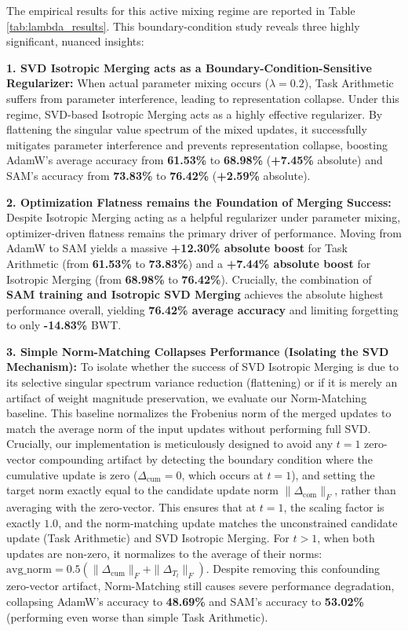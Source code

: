 The empirical results for this active mixing regime are reported in Table \ref{tab:lambda_results}. This boundary-condition study reveals three highly significant, nuanced insights:

\textbf{1. SVD Isotropic Merging acts as a Boundary-Condition-Sensitive Regularizer:} When actual parameter mixing occurs ($\lambda = 0.2$), Task Arithmetic suffers from parameter interference, leading to representation collapse. Under this regime, SVD-based Isotropic Merging acts as a highly effective regularizer. By flattening the singular value spectrum of the mixed updates, it successfully mitigates parameter interference and prevents representation collapse, boosting AdamW's average accuracy from \textbf{61.53\%} to \textbf{68.98\%} (\textbf{+7.45\%} absolute) and SAM's accuracy from \textbf{73.83\%} to \textbf{76.42\%} (\textbf{+2.59\%} absolute).

\textbf{2. Optimization Flatness remains the Foundation of Merging Success:} Despite Isotropic Merging acting as a helpful regularizer under parameter mixing, optimizer-driven flatness remains the primary driver of performance. Moving from AdamW to SAM yields a massive \textbf{+12.30\% absolute boost} for Task Arithmetic (from \textbf{61.53\%} to \textbf{73.83\%}) and a \textbf{+7.44\% absolute boost} for Isotropic Merging (from \textbf{68.98\%} to \textbf{76.42\%}). Crucially, the combination of \textbf{SAM training and Isotropic SVD Merging} achieves the absolute highest performance overall, yielding \textbf{76.42\% average accuracy} and limiting forgetting to only \textbf{-14.83\%} BWT.

\textbf{3. Simple Norm-Matching Collapses Performance (Isolating the SVD Mechanism):} To isolate whether the success of SVD Isotropic Merging is due to its selective singular spectrum variance reduction (flattening) or if it is merely an artifact of weight magnitude preservation, we evaluate our Norm-Matching baseline. This baseline normalizes the Frobenius norm of the merged updates to match the average norm of the input updates without performing full SVD. Crucially, our implementation is meticulously designed to avoid any $t=1$ zero-vector compounding artifact by detecting the boundary condition where the cumulative update is zero ($\Delta_{\text{cum}} = 0$, which occurs at $t=1$), and setting the target norm exactly equal to the candidate update norm $\|\Delta_{\text{com}}\|_F$, rather than averaging with the zero-vector. This ensures that at $t=1$, the scaling factor is exactly $1.0$, and the norm-matching update matches the unconstrained candidate update (Task Arithmetic) and SVD Isotropic Merging. For $t > 1$, when both updates are non-zero, it normalizes to the average of their norms: $\text{avg\_norm} = 0.5 (\|\Delta_{\text{cum}}\|_F + \|\Delta_{T_t}\|_F)$. Despite removing this confounding zero-vector artifact, Norm-Matching still causes severe performance degradation, collapsing AdamW's accuracy to \textbf{48.69\%} and SAM's accuracy to \textbf{53.02\%} (performing even worse than simple Task Arithmetic). 

